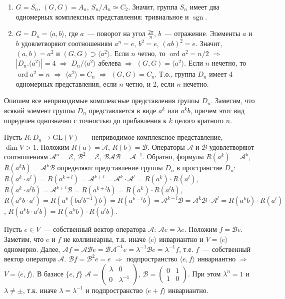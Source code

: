 \documentclass[a4paper]{article}
\newcommand{\ord}{\mathop{\mathrm{ord}}\nolimits}
\newcommand{\sgn}{\mathop{\mathrm{sgn}}\nolimits}
\begin{document}
\prim
\begin{enumerate}
  \item $G=S_n$, $(G,G)=A_n$, $S_n/A_n\simeq C_2$. Значит, группа
  $S_n$ имеет два одномерных комплексных представления: тривиальное
  и $\sgn$.
  \item $G=D_n=\langle a,b\rangle$, где $a$~--- поворот на угол
  $\frac{2\pi}{n}$, $b$~--- отражение. Элементы $a$ и $b$
  удовлетворяют соотношениям $a^n=e$, $b^2=e$, $(ab)^2=e$. Значит,
  $(a,b)=a^2$ и $(G,G)\supset \langle a^2\rangle$. Если $n$ четно,
  то $\ord a^2=n/2$ $\Rightarrow$ $|D_n.\langle a^2\rangle|=4$
  $\Rightarrow$ $D_n/\langle a^2\rangle$ абелева $\Rightarrow$ $(G,G)=\langle
  a^2\rangle$. Если $n$ нечетно, то $\ord a^2=n$ $\Rightarrow$ $\langle
  a^2\rangle=C_n$ $\Rightarrow$ $(G,G)=C_n$. Т.о., группа $D_n$
  имеет 4 одномерных представления, если $n$ четно, и 2, если $n$
  нечетно.
\end{enumerate}

Опишем все неприводимые комплексные представления группы $D_n$.
Заметим, что всякий элемент группы $D_n$ представляется в виде $a^k$
или $a^kb$, причем этот вид определен однозначно с точностью до
прибавления к $k$ целого кратного $n$.

Пусть $R\colon D_n\to \mathrm{GL}(V)$~--- неприводимое комплексное
представление, $\dim V>1$. Положим $R(a)=\mathcal{A}$,
$R(b)=\mathcal{B}$. Операторы $\mathcal{A}$ и $\mathcal{B}$
удовлетворяют соотношениям $\mathcal{A}^n=\mathcal{E}$,
$\mathcal{B}^2=\mathcal{E}$, $\mathcal{BAB}=\mathcal{A}^{-1}$.
Обратно, формулы $R(a^k)=\mathcal{A}^k$,
$R(a^kb)=\mathcal{A}^k\mathcal{B}$ определяют представление группы
$D_n$ в пространстве $D_n$: $R(a^k\cdot
a^l)=R(a^{k+l})=\mathcal{A}^{k+l}=\mathcal{A}^k\cdot\mathcal{A}^l=R(a^k)\cdot
R(a^l)$, $R(a^k\cdot
a^lb)=\mathcal{A}^{k+l}\mathcal{B}=R(a^{k+l}b)=R(a^k)\cdot R(a^lb)$,
$R(a^kb\cdot
a^l)=R(a^k(ba^lb^{-1})b)=R(a^{k-l}b)=\mathcal{A}^{k-l}\mathcal{B}=\mathcal{A}^k\mathcal{B}\cdot
\mathcal{A}^l=R(a^kb)\cdot R(a^l)$, $R(a^kb\cdot a^lb)=R(a^kb)\cdot
R(a^lb)$.

Пусть $e\in V$~--- собственный вектор оператора $\mathcal{A}$:
$\mathcal{A}e=\lambda e$. Положим $f=\mathcal{B}e$. Заметим, что $e$
и $f$ не коллинеарны, т.к. иначе $\langle e\rangle$ инвариантно и
$V=\langle e\rangle$ одномерно. Далее,
$\mathcal{A}f=\mathcal{AB}e=\mathcal{BA}^{-1}e=\lambda^{-1}\mathcal{B}e=\lambda^{-1}f$,
т.е. $f$~--- собственный вектор оператора $\mathcal{A}$.
$\mathcal{B}f=\mathcal{B}^2e=e$ $\Rightarrow$ подпространство
$\langle e,f\rangle$ инвариантно $\Rightarrow$ $V=\langle
e,f\rangle$. В базисе $\{e,f\}$
$\mathcal{A}=\left(\begin{smallmatrix} \lambda & 0\\
0 & \lambda^{-1} \end{smallmatrix}\right)$, $\mathcal{B}=\left(\begin{smallmatrix} 0 & 1\\
1 & 0 \end{smallmatrix}\right)$. При этом $\lambda^n=1$ и
$\lambda\neq \pm$, т.к. иначе $\lambda=\lambda^{-1}$ и
подпространство $\langle e+f\rangle$ инвариантно.
\end{document}
